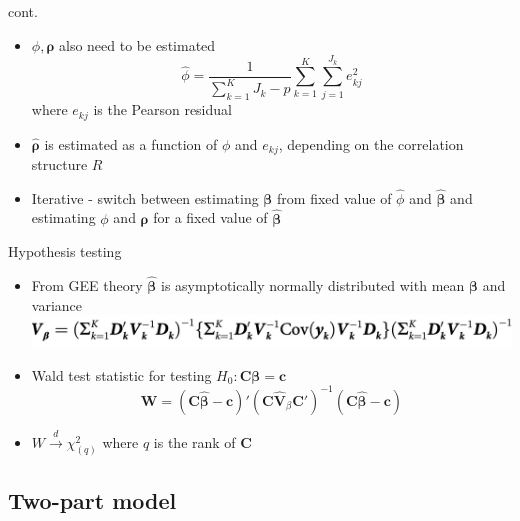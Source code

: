 \documentclass{beamer}
\begin{document}
\begin{frame}[t]{cont.}
  \begin{itemize}
    \item $\phi, \boldsymbol\rho$ also need to be estimated
    $$\hat\phi = \frac{1}{\sum_{k=1}^K J_k - p}\sum_{k=1}^K\sum_{j=1}^{J_k} e^2_{kj}$$
    where $e_{kj}$ is the Pearson residual
    \item $\hat{\boldsymbol\rho}$ is estimated as a function of $\phi$ and $e_{kj}$, depending on the correlation structure $R $
    \item Iterative - switch between estimating $\boldsymbol\beta$ from fixed value of $\hat\phi$ and $\hat{\boldsymbol\beta}$ and estimating $\phi$ and $\boldsymbol\rho$ for a fixed value of $\hat{\boldsymbol\beta}$
  \end{itemize}
\end{frame}


\begin{frame}[t]{Hypothesis testing}

  \begin{itemize}
    \item From GEE theory $\hat{\boldsymbol \beta}$ is asymptotically normally distributed with mean $\boldsymbol \beta$ and variance\\
    \includegraphics[width = \textwidth]{beta_var.png}
    \item Wald test statistic for testing $H_0: \boldsymbol{C\beta} = \boldsymbol c$
    $$\boldsymbol W = (\boldsymbol C \hat{\boldsymbol\beta} - \boldsymbol c)'(\boldsymbol C \hat{\boldsymbol V}_\beta \boldsymbol C')^{-1}(\boldsymbol C \hat{\boldsymbol\beta} - \boldsymbol c)$$
    \item $W \overset{d}{\to} \chi^2_{(q)}$ where $q$ is the rank of $\boldsymbol{C}$

  \end{itemize}

\end{frame}

\subsection{Two-part model }
\end{document}
